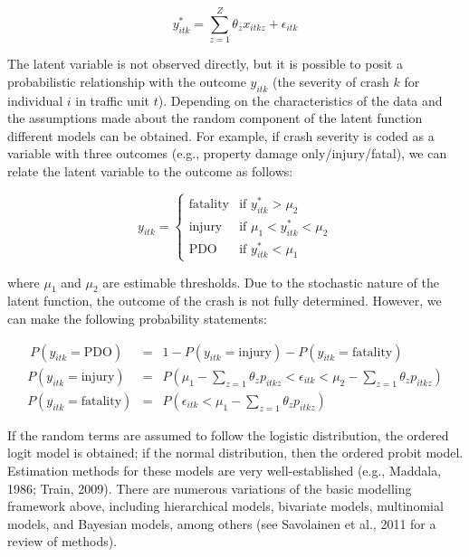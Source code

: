 \documentclass[]{elsarticle} %
\begin{document}
\begin{equation}
\label{eq:latent-function-compact}
y_{itk}^*=\sum_{z=1}^Z\theta_zx_{itkz} + \epsilon_{itk}
\end{equation}

The latent variable is not observed directly, but it is possible to
posit a probabilistic relationship with the outcome \(y_{itk}\) (the
severity of crash \(k\) for individual \(i\) in traffic unit \(t\)).
Depending on the characteristics of the data and the assumptions made
about the random component of the latent function different models can
be obtained. For example, if crash severity is coded as a variable with
three outcomes (e.g., property damage only/injury/fatal), we can relate
the latent variable to the outcome as follows:

\begin{equation}
\label{eq:latent-function-ordered-outcomes}
y_{itk} = 
\begin{cases}
\text{fatality} & \text{if } y_{itk}^*> \mu_2\\
\text{injury} & \text{if } \mu_1< y_{itk}^*< \mu_2\\
\text{PDO} & \text{if } y_{itk}^*< \mu_1
\end{cases}
\end{equation}

\noindent where \(\mu_1\) and \(\mu_2\) are estimable thresholds. Due to
the stochastic nature of the latent function, the outcome of the crash
is not fully determined. However, we can make the following probability
statements:

\begin{equation}
\label{eq:probability-ordered-outcomes}
\begin{array}{rcl}\
P(y_{itk} = \text{PDO}) &=& 1 - P(y_{itk} = \text{injury}) - P(y_{itk} = \text{fatality})\\ 
P(y_{itk} = \text{injury}) &=& P(\mu_1 - \sum_{z=1}\theta_zp_{itkz} < \epsilon_{itk} < \mu_2 - \sum_{z=1}\theta_zp_{itkz})\\
P(y_{itk} = \text{fatality}) &=& P(\epsilon_{itk} < \mu_1 - \sum_{z=1}\theta_zp_{itkz})
\end{array}
\end{equation}

If the random terms are assumed to follow the logistic distribution, the
ordered logit model is obtained; if the normal distribution, then the
ordered probit model. Estimation methods for these models are very
well-established (e.g., Maddala, 1986; Train, 2009). There are numerous
variations of the basic modelling framework above, including
hierarchical models, bivariate models, multinomial models, and Bayesian
models, among others (see Savolainen et al., 2011 for a review of
methods).
\end{document}
